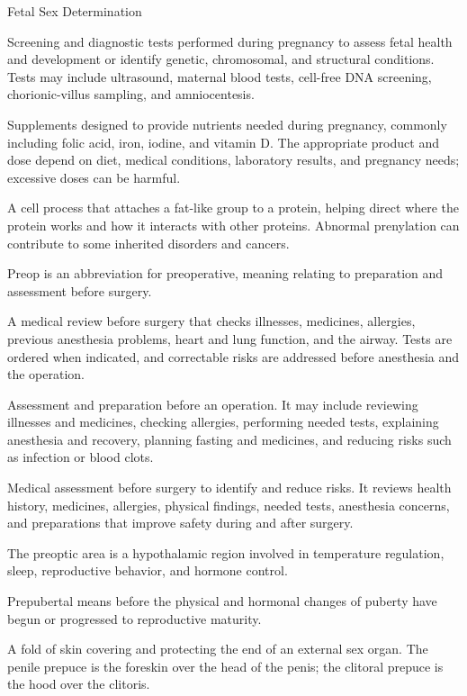 \synonyms
Fetal Sex Determination

 Screening and diagnostic tests performed during pregnancy to assess fetal health and development or identify genetic, chromosomal, and structural conditions. Tests may include ultrasound, maternal blood tests, cell-free DNA screening, chorionic-villus sampling, and amniocentesis.

 Supplements designed to provide nutrients needed during pregnancy, commonly including folic acid, iron, iodine, and vitamin D. The appropriate product and dose depend on diet, medical conditions, laboratory results, and pregnancy needs; excessive doses can be harmful.

 A cell process that attaches a fat-like group to a protein, helping direct where the protein works and how it interacts with other proteins. Abnormal prenylation can contribute to some inherited disorders and cancers.

 Preop is an abbreviation for preoperative, meaning relating to preparation and assessment before surgery.

 A medical review before surgery that checks illnesses, medicines, allergies, previous anesthesia problems, heart and lung function, and the airway. Tests are ordered when indicated, and correctable risks are addressed before anesthesia and the operation.

 Assessment and preparation before an operation. It may include reviewing illnesses and medicines, checking allergies, performing needed tests, explaining anesthesia and recovery, planning fasting and medicines, and reducing risks such as infection or blood clots.

 Medical assessment before surgery to identify and reduce risks. It reviews health history, medicines, allergies, physical findings, needed tests, anesthesia concerns, and preparations that improve safety during and after surgery.

 The preoptic area is a hypothalamic region involved in temperature regulation, sleep, reproductive behavior, and hormone control.

 Prepubertal means before the physical and hormonal changes of puberty have begun or progressed to reproductive maturity.

 A fold of skin covering and protecting the end of an external sex organ. The penile prepuce is the foreskin over the head of the penis; the clitoral prepuce is the hood over the clitoris.

